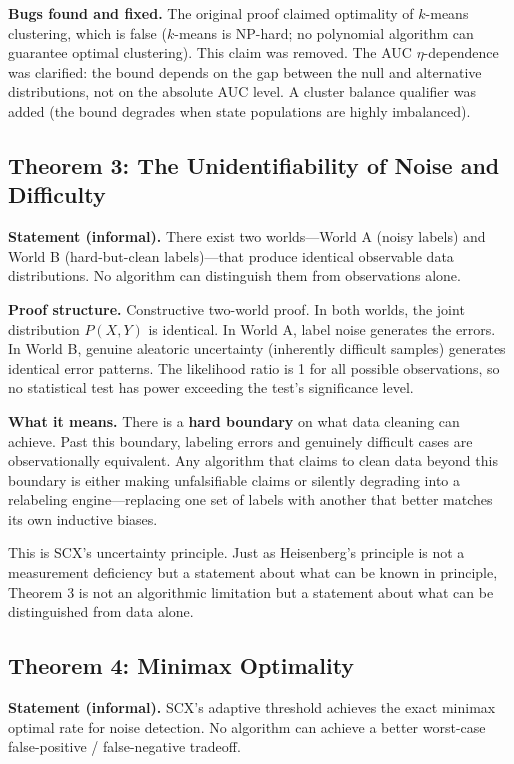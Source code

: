 \documentclass[12pt,a4paper]{ctexart}
\begin{document}
\textbf{Bugs found and fixed.} The original proof claimed optimality of $k$-means clustering, which is false ($k$-means is NP-hard; no polynomial algorithm can guarantee optimal clustering). This claim was removed. The AUC $\eta$-dependence was clarified: the bound depends on the gap between the null and alternative distributions, not on the absolute AUC level. A cluster balance qualifier was added (the bound degrades when state populations are highly imbalanced).

\subsection{Theorem 3: The Unidentifiability of Noise and Difficulty}

\textbf{Statement (informal).} There exist two worlds—World A (noisy labels) and World B (hard-but-clean labels)—that produce identical observable data distributions. No algorithm can distinguish them from observations alone.

\textbf{Proof structure.} Constructive two-world proof. In both worlds, the joint distribution $P(X, Y)$ is identical. In World A, label noise generates the errors. In World B, genuine aleatoric uncertainty (inherently difficult samples) generates identical error patterns. The likelihood ratio is 1 for all possible observations, so no statistical test has power exceeding the test's significance level.

\textbf{What it means.} There is a \textbf{hard boundary} on what data cleaning can achieve. Past this boundary, labeling errors and genuinely difficult cases are observationally equivalent. Any algorithm that claims to clean data beyond this boundary is either making unfalsifiable claims or silently degrading into a relabeling engine—replacing one set of labels with another that better matches its own inductive biases.

This is SCX's uncertainty principle. Just as Heisenberg's principle is not a measurement deficiency but a statement about what can be known in principle, Theorem 3 is not an algorithmic limitation but a statement about what can be distinguished from data alone.

\subsection{Theorem 4: Minimax Optimality}

\textbf{Statement (informal).} SCX's adaptive threshold achieves the exact minimax optimal rate for noise detection. No algorithm can achieve a better worst-case false-positive / false-negative tradeoff.
\end{document}
